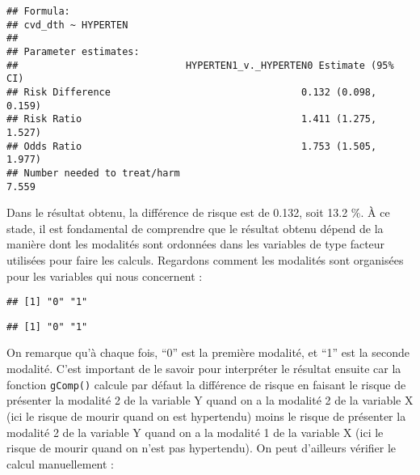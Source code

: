 \documentclass[
]{book}
\newenvironment{Shaded}{\begin{snugshade}}{\end{snugshade}}
\newcommand{\FunctionTok}[1]{\textcolor[rgb]{0.00,0.00,0.00}{#1}}
\newcommand{\NormalTok}[1]{#1}
\newcommand{\SpecialCharTok}[1]{\textcolor[rgb]{0.00,0.00,0.00}{#1}}
\begin{document}
\begin{verbatim}
## Formula: 
## cvd_dth ~ HYPERTEN 
## 
## Parameter estimates: 
##                             HYPERTEN1_v._HYPERTEN0 Estimate (95% CI)
## Risk Difference                                 0.132 (0.098, 0.159)
## Risk Ratio                                      1.411 (1.275, 1.527)
## Odds Ratio                                      1.753 (1.505, 1.977)
## Number needed to treat/harm                                    7.559
\end{verbatim}

Dans le résultat obtenu, la différence de risque est de 0.132, soit 13.2 \%. À ce stade, il est fondamental de comprendre que le résultat obtenu dépend de la manière dont les modalités sont ordonnées dans les variables de type facteur utilisées pour faire les calculs. Regardons comment les modalités sont organisées pour les variables qui nous concernent :

\begin{Shaded}
\end{Shaded}

\begin{verbatim}
## [1] "0" "1"
\end{verbatim}

\begin{Shaded}
\end{Shaded}

\begin{verbatim}
## [1] "0" "1"
\end{verbatim}

On remarque qu'à chaque fois, ``0'' est la première modalité, et ``1'' est la seconde modalité. C'est important de le savoir pour interpréter le résultat ensuite car la fonction \texttt{gComp()} calcule par défaut la différence de risque en faisant le risque de présenter la modalité 2 de la variable Y quand on a la modalité 2 de la variable X (ici le risque de mourir quand on est hypertendu) moins le risque de présenter la modalité 2 de la variable Y quand on a la modalité 1 de la variable X (ici le risque de mourir quand on n'est pas hypertendu). On peut d'ailleurs vérifier le calcul manuellement :
\end{document}
